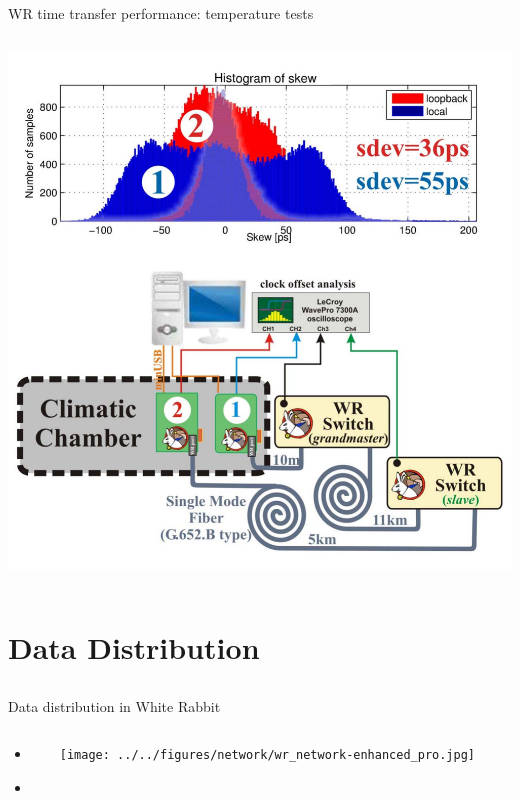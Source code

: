 \documentclass[compress,red]{beamer}
\begin{document}
\begin{frame}{WR time transfer performance: temperature tests}
\begin{columns}[c]
		\hspace{-0.8cm}
		\begin{center}
		\includegraphics[width=1.13\textwidth]{../../figures/measurements/tempTests-2-combo.pdf}
		\end{center}


  \end{columns} 
\end{frame}
\section{Data Distribution}
\subsection{}
\begin{frame}{Data distribution in White Rabbit}


\begin{columns}[c]
 
  \begin{itemize}
    \item \color{gray}{High accuracy/precision synchronization}
    \item \textbf{\color{red}{Deterministic, reliable and low-latency Control Data delivery}}
  \end{itemize}

    \begin{center}
    \texttt{[image: ../../figures/network/wr\_network-enhanced\_pro.jpg]}
    \end{center}
\end{columns}

\end{frame}
\end{document}
